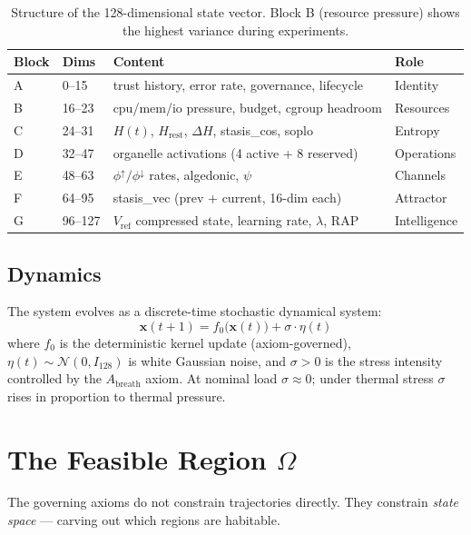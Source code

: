 \documentclass[11pt, a4paper]{article}
\newcommand{\sv}{\bm{x}}
\begin{document}
\begin{table}[h]
\centering
\small
\begin{tabular}{llll}
\toprule
Block & Dims & Content & Role \\
\midrule
A & 0--15   & trust history, error rate, governance, lifecycle & Identity \\
B & 16--23  & cpu/mem/io pressure, budget, cgroup headroom   & Resources \\
C & 24--31  & $H(t)$, $H_\text{rest}$, $\Delta H$, stasis\_cos, soplo & Entropy \\
D & 32--47  & organelle activations (4 active + 8 reserved)  & Operations \\
E & 48--63  & $\phi^\uparrow/\phi^\downarrow$ rates, algedonic, $\psi$ & Channels \\
F & 64--95  & stasis\_vec (prev + current, 16-dim each)       & Attractor \\
G & 96--127 & $V_\text{ref}$ compressed state, learning rate, $\lambda$, RAP & Intelligence \\
\bottomrule
\end{tabular}
\caption{Structure of the 128-dimensional state vector.
Block B (resource pressure) shows the highest variance during experiments.}
\label{tab:blocks}
\end{table}

\subsection{Dynamics}

The system evolves as a discrete-time stochastic dynamical system:
\begin{equation}
  \sv(t+1) = f_0\bigl(\sv(t)\bigr) + \sigma \cdot \eta(t)
\label{eq:dynamics}
\end{equation}
where $f_0$ is the deterministic kernel update (axiom-governed),
$\eta(t) \sim \mathcal{N}(0, I_{128})$ is white Gaussian noise,
and $\sigma > 0$ is the stress intensity controlled by the $A_\text{breath}$
axiom.
At nominal load $\sigma \approx 0$; under thermal stress $\sigma$
rises in proportion to thermal pressure.


\section{The Feasible Region $\Omega$}
\label{sec:feasible}

The governing axioms do not constrain trajectories directly.
They constrain \emph{state space} — carving out which regions are habitable.
\end{document}
